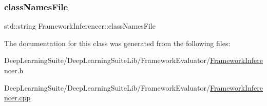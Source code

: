 \subsubsection{\texorpdfstring{class\+Names\+File}{classNamesFile}}
{\footnotesize\ttfamily std\+::string Framework\+Inferencer\+::class\+Names\+File\hspace{0.3cm}{\ttfamily [protected]}}



The documentation for this class was generated from the following files\+:\begin{DoxyCompactItemize}
\item 
Deep\+Learning\+Suite/\+Deep\+Learning\+Suite\+Lib/\+Framework\+Evaluator/\hyperlink{_framework_inferencer_8h}{Framework\+Inferencer.\+h}\item 
Deep\+Learning\+Suite/\+Deep\+Learning\+Suite\+Lib/\+Framework\+Evaluator/\hyperlink{_framework_inferencer_8cpp}{Framework\+Inferencer.\+cpp}\end{DoxyCompactItemize}
